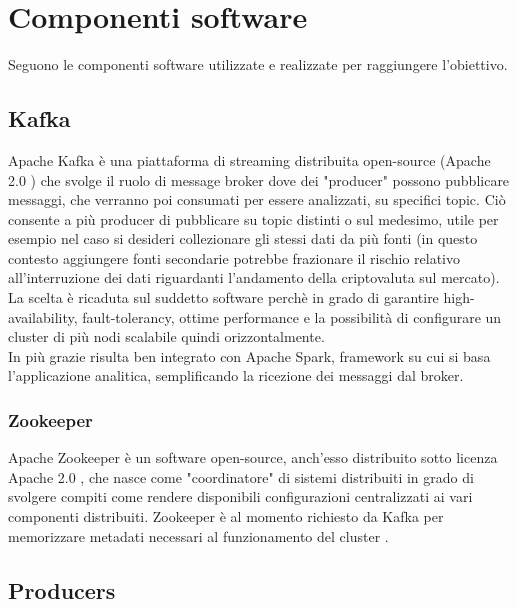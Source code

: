 \section{Componenti software}

Seguono le componenti software utilizzate e realizzate per raggiungere l'obiettivo.

\subsection{Kafka}

Apache Kafka è una piattaforma di streaming distribuita open-source
(Apache 2.0 \cite{apache2_license}) che svolge il ruolo di message broker
dove dei "producer" possono pubblicare messaggi, che verranno poi consumati per essere analizzati,
su specifici topic. Ciò consente a più producer di pubblicare su topic distinti o sul medesimo,
utile per esempio nel caso si desideri collezionare gli stessi dati da più fonti
(in questo contesto aggiungere fonti secondarie potrebbe frazionare il rischio relativo
all'interruzione dei dati riguardanti l'andamento della criptovaluta sul mercato).
\\
La scelta è ricaduta sul suddetto software perchè in grado di garantire
high-availability, fault-tolerancy, ottime performance e la possibilità di configurare un cluster
di più nodi scalabile quindi orizzontalmente. \cite{kafka_doc}
\\
In più grazie risulta ben integrato con Apache Spark, framework su cui si basa l'applicazione
analitica, semplificando la ricezione dei messaggi dal broker.


\subsubsection{Zookeeper}

Apache Zookeeper è un software open-source, anch'esso distribuito sotto licenza
Apache 2.0 \cite{apache2_license}, che nasce come "coordinatore" di sistemi distribuiti
in grado di svolgere compiti come rendere disponibili configurazioni centralizzati ai vari
componenti distribuiti. Zookeeper è al momento richiesto da Kafka per memorizzare metadati
necessari al funzionamento del cluster \cite{kafka_zookeeper}.

\subsection{Producers}

